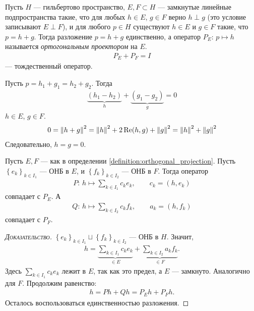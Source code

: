 \documentclass[../complex-analysis.tex]{subfiles}
\begin{document}
\begin{df}
 \label{definition:orthogonal_projection}
 Пусть $ H $ --- гильбертово пространство, $ E, F \subset H $ --- замкнутые линейные подпространства такие, что для любых $ h \in E $, $ g \in F $ верно $ h \perp g $ (это условие записывают $ E \perp F $), и для любого $ p \in H $ существуют $ h \in E $ и $ g \in F $ такие, что $ p = h + g $. Тогда разложение $ p = h + g $ единственно, а оператор $ P_E \colon\, p \mapsto h $ называется \textit{ортогональным проектором} на $ E $.
 \begin{align*}
  P_E + P_F = I
 \end{align*} --- тождественный оператор.
\end{df}
\begin{remrk}
 Пусть $ p = h_1 + g_1 = h_2 + g_2 $. Тогда
 \begin{align*}
  \underbrace{(h_1 - h_2)}_h + \underbrace{(g_1-g_2)}_g = 0
 \end{align*} $ h \in E $, $ g \in F $.
 \begin{align*}
  0 = \left\| h+g \right\|^{2} = \left\| h \right\|^{2} + 2 \operatorname{Re} (h,g) + \left\| g \right\|^{2} = \left\| h \right\|^{2} + \left\| g \right\|^{2}
 \end{align*} Следовательно, $ h=g=0 $.
\end{remrk}

\begin{thm}
  Пусть $ E,F $ --- как в определении \eqref{definition:orthogonal_projection}.
  Пусть $ \left\{e_k\right\}_{k\in I_1}  $ --- ОНБ в $ E $, и $ \left\{f_k\right\}_{k\in I_2}  $ --- ОНБ в $ F $. Тогда оператор \begin{align*}
  P \colon\, h \mapsto \sum_{k\in I_1} c_ke_k, \qquad c_k=(h,e_k)
 \end{align*} совпадает с $ P_E $. А
 \begin{align*}
  Q \colon\, h \mapsto \sum_{k \in I_2} c_kf_k, \qquad a_k=(h,f_k)
 \end{align*} совпадает с $ P_F $.
\end{thm}
\begin{proof}[\normalfont\textsc{Доказательство}]
 $ \left\{e_k\right\}_{k \in I_1} \sqcup \left\{f_k\right\}_{k \in I_2}  $ --- ОНБ в $ H $. Значит,
 \begin{align*}
  h = \underbrace{\sum_{k\in I_1}c_k e_k}_{\in E} + \underbrace{\sum_{k \in I_2} a_k f_k}_{\in F}.
 \end{align*} Здесь $ \sum_{k\in I_1}c_ke_k  $ лежит в $ E $, так как это предел, а $ E $ --- замкнуто. Аналогично для $ F $. Продолжим равенство:
 \begin{align*}
  h = P h + Q h = P_E h + P_F h.
 \end{align*} Осталось воспользоваться единственностью разложения.
\end{proof}
\end{document}
